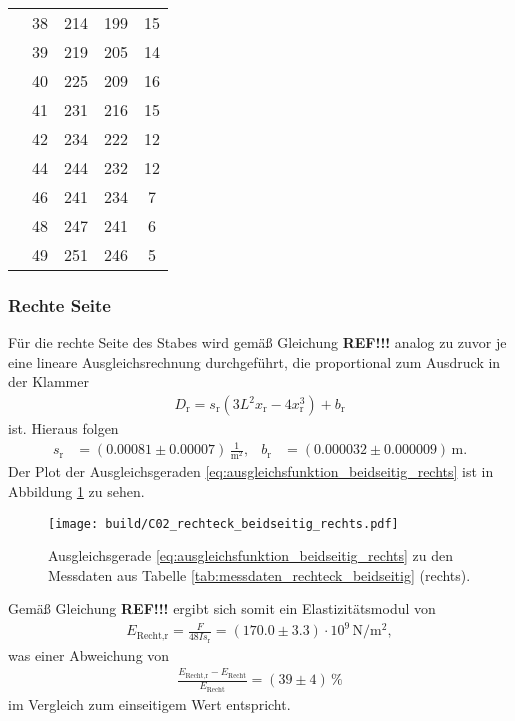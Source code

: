 \begin{table}[H]
\begin{tabular}[]{S S[table-format = 2.0] S S S[table-format = 2.0]}
                 & 38 & 214 & 199 & 15 \\
                 & 39 & 219 & 205 & 14 \\
                 & 40 & 225 & 209 & 16 \\
                 & 41 & 231 & 216 & 15 \\
                 & 42 & 234 & 222 & 12 \\
                 & 44 & 244 & 232 & 12 \\
                 & 46 & 241 & 234 &  7 \\
                 & 48 & 247 & 241 &  6 \\
                 & 49 & 251 & 246 &  5 \\
        \bottomrule
    \end{tabular}
\end{table}

\subsubsection{Rechte Seite}
Für die rechte Seite des Stabes wird gemäß Gleichung \textbf{REF!!!} analog zu zuvor je eine lineare Ausgleichsrechnung durchgeführt,
die proportional zum Ausdruck in der Klammer
\begin{align}
    D_\text{r} = s_\text{r} \left(3 L^2 x_\text{r} - 4 x_\text{r}^3\right) + b_\text{r}
    \label{eq:ausgleichsfunktion_beidseitig_rechts}
\end{align}
ist.
Hieraus folgen 
\begin{align*}
    s_\text{r} &= (\num{0.00081} \pm \num{0.00007}) \, \frac{1}{\unit{\meter^2}}, & 
    b_\text{r} &= (\num{0.000032} \pm \num{0.000009}) \, \unit{\meter}.
\end{align*}
Der Plot der Ausgleichsgeraden \eqref{eq:ausgleichsfunktion_beidseitig_rechts} ist in Abbildung \ref{fig:plot_rechteck_beidseitig_rechts}
zu sehen.
%
\begin{figure}[H]
    \centering
    \texttt{[image: build/C02\_rechteck\_beidseitig\_rechts.pdf]}
    \caption{Ausgleichsgerade \eqref{eq:ausgleichsfunktion_beidseitig_rechts} zu den Messdaten aus Tabelle \ref{tab:messdaten_rechteck_beidseitig} (rechts).}
    \label{fig:plot_rechteck_beidseitig_rechts}
\end{figure}

\noindent
Gemäß Gleichung \textbf{REF!!!} ergibt sich somit ein Elastizitätsmodul von 
\begin{align}
    E_\text{Recht,r} = \frac{F}{48 I s_\text{r}} = (\num{170.0} \pm \num{3.3}) \cdot 10^9 \, \unit{\newton\per\meter^2},
\end{align}
was einer Abweichung von 
\begin{align*}
    \frac{E_\text{Recht,r} - E_\text{Recht}}{E_\text{Recht}} = (\num{39} \pm \num{4}) \, \%
\end{align*}
im Vergleich zum einseitigem Wert entspricht.




